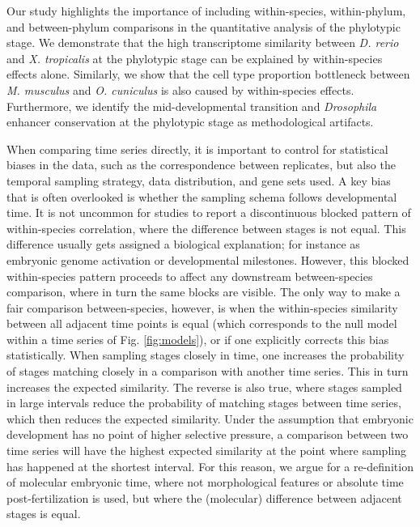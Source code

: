 Our study highlights the importance of including within-species, within-phylum, and between-phylum comparisons in the quantitative analysis of the phylotypic stage. We demonstrate that the high transcriptome similarity between \textit{D. rerio} and \textit{X. tropicalis} at the phylotypic stage\cite{marletaz2018} can be explained by within-species effects alone. Similarly, we show that the cell type proportion  bottleneck between \textit{M. musculus} and \textit{O. cuniculus}\cite{Mayshar2023} is also caused by within-species effects. Furthermore, we identify the mid-developmental transition\cite{Levin2016} and \textit{Drosophila} enhancer conservation at the phylotypic stage\cite{Liu2021} as methodological artifacts. 

When comparing time series directly, it is important to control for statistical biases in the data, such as the correspondence between replicates, but also the temporal sampling strategy, data distribution, and gene sets used. A key bias that is often overlooked is whether the sampling schema follows developmental time\cite{BinindaEmonds2002}. It is not uncommon for studies to report a discontinuous blocked pattern of within-species correlation, where the difference between stages is not equal. This difference usually gets assigned a biological explanation; for instance as embryonic genome activation\cite{Yanai2011} or developmental milestones\cite{Levin2012}. However, this blocked within-species pattern proceeds to affect any downstream between-species comparison, where in turn the same blocks are visible. The only way to make a fair comparison between-species, however, is when the within-species similarity between all adjacent time points is equal (which corresponds to the null model within a time series of Fig. \ref{fig:models}), or if one explicitly corrects this bias statistically. When sampling stages closely in time, one increases the probability of stages matching closely in a comparison with another time series. This in turn increases the expected similarity. The reverse is also true, where stages sampled in large intervals reduce the probability of matching stages between time series, which then reduces the expected similarity. Under the assumption that embryonic development has no point of higher selective pressure, a comparison between two time series will have the highest expected similarity at the point where sampling has happened at the shortest interval. For this reason, we argue for a re-definition of molecular embryonic time, where not morphological features or absolute time post-fertilization is used, but where the (molecular) difference between adjacent stages is equal. 

